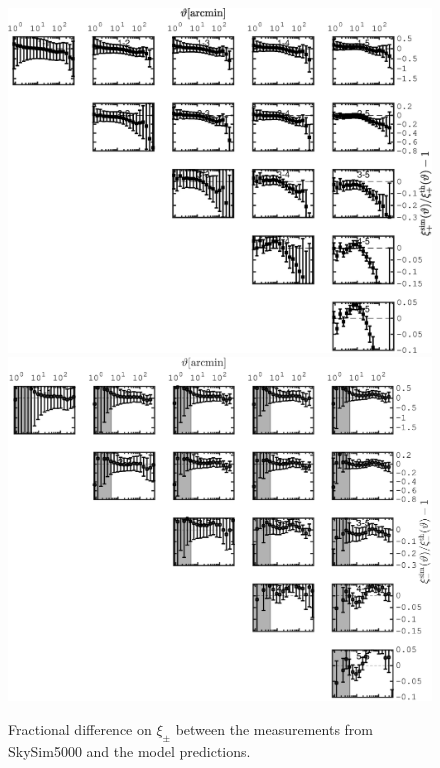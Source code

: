 \documentclass[useAMS,usenatbib]{mn2e}
\begin{document}


\appendix


\begin{figure}
\includegraphics[width=\columnwidth]{graphs/xip_sims_vs_th.eps}
\includegraphics[width=\columnwidth]{graphs/xim_sims_vs_th.eps}
\caption{Fractional difference on $\xi_\pm$ between the measurements from SkySim5000 and the model predictions.  }
\label{fig:frac_err_sims_th}
\end{figure}
\end{document}
